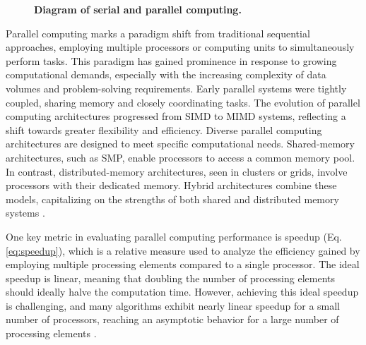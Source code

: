 \documentclass[Ingles]{phdthesis}
\begin{document}
\begin{figure}[h]
  \caption[Diagram of serial and parallel computing]{\textbf{Diagram of serial and parallel computing.}}
  \label{fig:computing-strategies}
\end{figure}

Parallel computing marks a paradigm shift from traditional sequential approaches, employing multiple processors or computing units to simultaneously perform tasks. This paradigm has gained prominence in response to growing computational demands, especially with the increasing complexity of data volumes and problem-solving requirements. Early parallel systems were tightly coupled, sharing memory and closely coordinating tasks. The evolution of parallel computing architectures progressed from \ac{SIMD} to \ac{MIMD} systems, reflecting a shift towards greater flexibility and efficiency. Diverse parallel computing architectures are designed to meet specific computational needs. Shared-memory architectures, such as \ac{SMP}, enable processors to access a common memory pool. In contrast, distributed-memory architectures, seen in clusters or grids, involve processors with their dedicated memory. Hybrid architectures combine these models, capitalizing on the strengths of both shared and distributed memory systems \cite{matloff2012}.

One key metric in evaluating parallel computing performance is speedup (Eq. \ref{eq:speedup}), which is a relative measure used to analyze the efficiency gained by employing multiple processing elements compared to a single processor. The ideal speedup is linear, meaning that doubling the number of processing elements should ideally halve the computation time. However, achieving this ideal speedup is challenging, and many algorithms exhibit nearly linear speedup for a small number of processors, reaching an asymptotic behavior for a large number of processing elements \cite{grama2003,matloff2012}.
\end{document}
